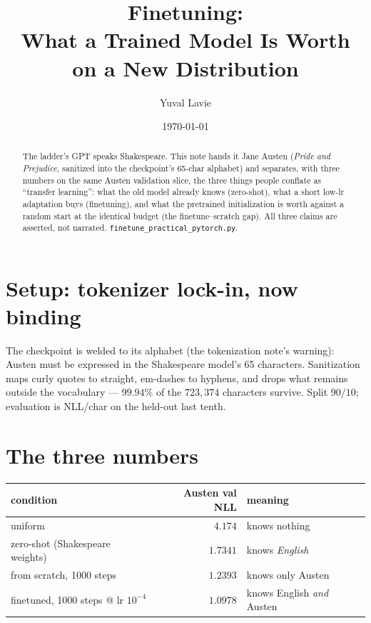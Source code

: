 \documentclass[11pt]{article}
\title{Finetuning:\\
What a Trained Model Is Worth on a New Distribution}
\author{Yuval Lavie}
\date{\today}
\begin{document}
\maketitle

\begin{abstract}
The ladder's GPT speaks Shakespeare. This note hands it Jane Austen
(\emph{Pride and Prejudice}, sanitized into the checkpoint's 65-char
alphabet) and separates, with three numbers on the same Austen
validation slice, the three things people conflate as ``transfer
learning'': what the old model already knows (zero-shot), what a short
low-lr adaptation buys (finetuning), and what the pretrained
initialization is worth against a random start at the identical budget
(the finetune--scratch gap). All three claims are asserted, not
narrated. \texttt{finetune\_practical\_pytorch.py}.
\end{abstract}

\section{Setup: tokenizer lock-in, now binding}

The checkpoint is welded to its alphabet (the tokenization note's
warning): Austen must be expressed in the Shakespeare model's 65
characters. Sanitization maps curly quotes to straight, em-dashes to
hyphens, and drops what remains outside the vocabulary ---
$99.94\%$ of the $723{,}374$ characters survive. Split $90/10$;
evaluation is NLL/char on the held-out last tenth.

\section{The three numbers}

\begin{center}
\begin{tabular}{lrl}
\toprule
condition & Austen val NLL & meaning\\
\midrule
uniform & $4.174$ & knows nothing\\
zero-shot (Shakespeare weights) & $1.7341$ & knows \emph{English}\\
from scratch, 1000 steps & $1.2393$ & knows only Austen\\
finetuned, 1000 steps @ lr $10^{-4}$ & $\mathbf{1.0978}$
  & knows English \emph{and} Austen\\
\bottomrule
\end{tabular}
\end{center}
\end{document}
